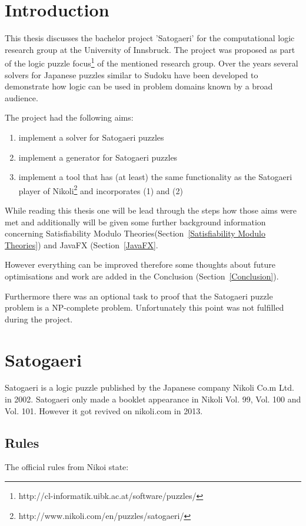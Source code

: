 
\chapter{Introduction} \label{Introduction}
This thesis discusses the bachelor project 'Satogaeri' for the computational logic research group at the University of Innsbruck. The project was proposed as part of the logic puzzle focus\footnote{http://cl-informatik.uibk.ac.at/software/puzzles/} of the mentioned research group. Over the years several solvers for Japanese puzzles similar to Sudoku have been developed to demonstrate how logic can be used in problem domains known by a broad audience.

The project had the following aims: 
\begin{enumerate}
	\item implement a solver for Satogaeri puzzles
	\item implement a generator for Satogaeri puzzles
	\item implement a tool that has (at least) the same functionality as the Satogaeri player of Nikoli\footnote{http://www.nikoli.com/en/puzzles/satogaeri/} and incorporates (1) and (2)
\end{enumerate}

While reading this thesis one will be lead through the steps how those aims were met and additionally will be given some further background information concerning Satisfiability Modulo Theories(Section~\ref{Satisfiability Modulo Theories}) and JavaFX (Section~\ref{JavaFX}.

However everything can be improved therefore some thoughts about future optimisations and work are added in the Conclusion (Section~\ref{Conclusion}).

Furthermore there was an optional task to proof that the Satogaeri puzzle problem is a NP-complete problem. Unfortunately this point was not fulfilled during the project.

\chapter{Satogaeri} \label{Satogaeri}
Satogaeri is a logic puzzle published by the Japanese company Nikoli Co.m Ltd. in 2002. Satogaeri only made a booklet appearance in Nikoli Vol. 99, Vol. 100 and Vol. 101. However it got revived on nikoli.com in 2013.

\section{Rules}
The official rules from Nikoi state:

